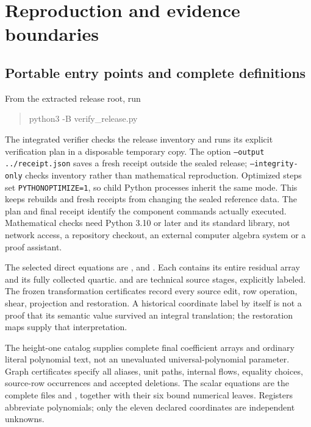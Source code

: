 \section{Reproduction and evidence boundaries}
\label{sec:verification}
\subsection{Portable entry points and complete definitions}
From the extracted release root, run
\begin{quote}\ttfamily
python3 -B verify\_release.py
\end{quote}
The integrated verifier checks the release inventory and runs its explicit
verification plan in a disposable temporary copy. The option
\texttt{--output ../receipt.json} saves a fresh receipt outside the sealed
release; \texttt{--integrity-only} checks inventory rather than mathematical
reproduction. Optimized steps set \texttt{PYTHONOPTIMIZE=1}, so child
Python processes inherit the same mode. This keeps rebuilds and
fresh receipts from changing the sealed reference data. The plan and final
receipt identify the component commands actually executed. Mathematical
checks need Python 3.10 or later and its standard library, not network
access, a repository checkout, an external computer algebra system or a
proof assistant.

The selected direct equations are ,
 and .
Each contains its entire residual array and its fully collected quartic.
 and  are technical
source stages, explicitly labeled. The frozen transformation certificates
record every source edit, row operation, shear, projection and restoration.
A historical coordinate label by itself is not a proof that its semantic
value survived an integral translation; the restoration maps supply that
interpretation.

The height-one catalog supplies complete final coefficient arrays and
ordinary literal polynomial text, not an unevaluated universal-polynomial
parameter. Graph certificates specify all aliases, unit paths, internal
flows, equality choices, source-row occurrences and accepted deletions.
The scalar equations are the complete files
 and
, together with their six
bound numerical leaves. Registers abbreviate polynomials; only the eleven
declared coordinates are independent unknowns.

